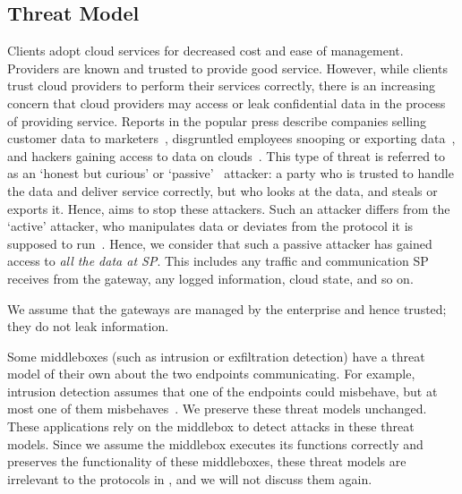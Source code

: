 \subsection{Threat Model}
  Clients adopt cloud services for decreased cost and ease of management. Providers are known and trusted to provide good service. 
  However, while clients trust cloud providers to perform their services correctly, there is an increasing concern that cloud providers may access or leak confidential data in the process of providing service.
  Reports in the popular press describe companies selling customer data to marketers~\cite{radioshack}, disgruntled employees snooping or exporting data~\cite{att}, and hackers gaining access to data on clouds~\cite{databreach,PrivacyRecords}.
  This type of threat is referred to as an `honest but curious' or `passive'~\cite{goodrich} attacker: a party who is trusted to handle the data and deliver service correctly, but who looks at the data, and steals or exports it.  Hence, \sys aims to stop these attackers.
  Such an attacker differs from the `active' attacker, who manipulates data or deviates from the protocol it is supposed to run~\cite{goodrich}.
%
Hence, we consider that such a passive attacker has gained access 
to {\em all the data at SP}.
This includes any traffic and communication SP receives from the 
gateway, any logged information, cloud state, and so on.  
 
We assume that the gateways are managed by the enterprise and hence trusted; they do not leak information.


Some middleboxes (such as intrusion or exfiltration detection) have a threat model
of their own about the two endpoints communicating. For example, intrusion detection assumes that 
one of the endpoints could misbehave, but at most one of them misbehaves~\cite{bro}.  
We preserve these threat models unchanged. These applications rely
on the middlebox to detect attacks in these threat models. Since we assume the middlebox executes
its functions correctly and \sys preserves the functionality of these middleboxes, 
these threat models are irrelevant to the protocols in \sys, and we will not discuss them again. 

